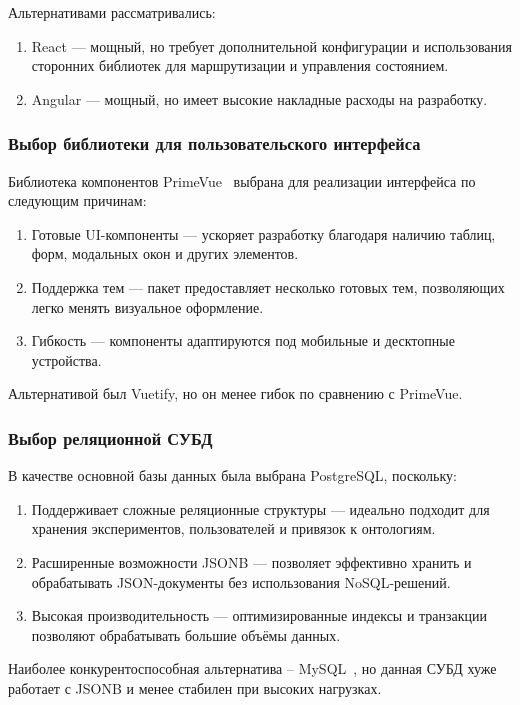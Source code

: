 Альтернативами рассматривались:
\begin{enumerate}
    \item React — мощный, но требует дополнительной конфигурации и использования сторонних библиотек для маршрутизации и управления состоянием.
    \item Angular — мощный, но имеет высокие накладные расходы на разработку.
\end{enumerate}

\subsubsection{Выбор библиотеки для пользовательского интерфейса}

Библиотека компонентов PrimeVue~\cite{Framework:PrimeVue} выбрана для реализации интерфейса по следующим причинам:
\begin{enumerate}
    \item Готовые UI-компоненты — ускоряет разработку благодаря наличию таблиц, форм, модальных окон и других элементов.
    \item Поддержка тем — пакет предоставляет несколько готовых тем, позволяющих легко менять визуальное оформление.
    \item Гибкость — компоненты адаптируются под мобильные и десктопные устройства.
\end{enumerate}

Альтернативой был Vuetify, но он менее гибок по сравнению с PrimeVue.

\subsubsection{Выбор реляционной СУБД}

В качестве основной базы данных была выбрана PostgreSQL, поскольку:
\begin{enumerate}
    \item Поддерживает сложные реляционные структуры — идеально подходит для хранения экспериментов, пользователей и привязок к онтологиям.
    \item Расширенные возможности JSONB — позволяет эффективно хранить и обрабатывать JSON-документы без использования NoSQL-решений.
    \item Высокая производительность — оптимизированные индексы и транзакции позволяют обрабатывать большие объёмы данных.
\end{enumerate}

Наиболее конкурентоспособная альтернатива – MySQL~\cite{DB:MySQL}, но данная СУБД хуже работает с JSONB и менее стабилен при высоких нагрузках.

